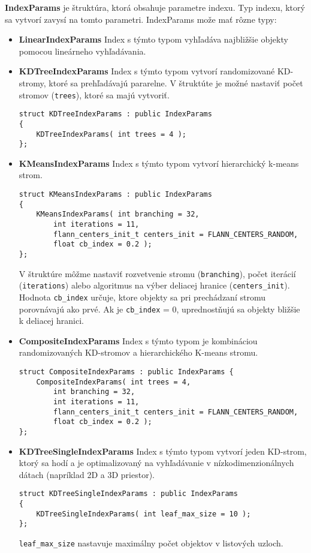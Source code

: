 \documentclass[12pt,oneside]{fithesis2}
\begin{document}
\textbf{IndexParams} je štruktúra, ktorá obsahuje parametre indexu. Typ indexu, ktorý sa vytvorí zavysí na tomto parametri. IndexParams može mať rôzne typy:
\begin{itemize}

\item \textbf{LinearIndexParams} Index s týmto typom vyhľadáva najbližšie objekty pomocou lineárneho vyhľadávania.

\item \textbf{KDTreeIndexParams} Index s týmto typom vytvorí randomizované KD-stromy, ktoré sa prehľadávajú pararelne. V štruktúte je možné nastaviť počet stromov (\texttt{trees}), ktoré sa majú vytvoriť.
{\scriptsize
\begin{lstlisting}
struct KDTreeIndexParams : public IndexParams
{
	KDTreeIndexParams( int trees = 4 );
};
\end{lstlisting}}
\item \textbf{KMeansIndexParams} Index s týmto typom vytvorí hierarchický k-means strom.
{\scriptsize
\begin{lstlisting}
struct KMeansIndexParams : public IndexParams
{
	KMeansIndexParams( int branching = 32,
		int iterations = 11,
		flann_centers_init_t centers_init = FLANN_CENTERS_RANDOM,
		float cb_index = 0.2 );
};
\end{lstlisting}}
V štruktúre môžme nastaviť rozvetvenie stromu (\texttt{branching}), počet iterácií (\texttt{iterations}) alebo algoritmus na výber deliacej hranice (\texttt{centers\_init}). Hodnota \texttt{cb\_index} určuje, ktore objekty sa pri prechádzaní stromu porovnávajú ako prvé. Ak je \texttt{cb\_index} = 0, uprednostňujú sa objekty bližšie k deliacej hranici.

\item \textbf{CompositeIndexParams} Index s týmto typom je kombináciou randomizovaných KD-stromov a hierarchického K-means stromu.
{\scriptsize
\begin{lstlisting}
struct CompositeIndexParams : public IndexParams {
	CompositeIndexParams( int trees = 4,
		int branching = 32,
		int iterations = 11,
		flann_centers_init_t centers_init = FLANN_CENTERS_RANDOM,
		float cb_index = 0.2 );
};
\end{lstlisting}}

\item \textbf{KDTreeSingleIndexParams} Index s týmto typom vytvorí jeden KD-strom, ktorý sa hodí a je optimalizovaný na vyhľadávanie v nízkodimenzionálnych dátach (napríklad 2D a 3D priestor).
{\scriptsize
\begin{lstlisting}
struct KDTreeSingleIndexParams : public IndexParams
{
	KDTreeSingleIndexParams( int leaf_max_size = 10 );
};
\end{lstlisting}}
\texttt{leaf\_max\_size} nastavuje maximálny počet objektov v listových uzloch.


\end{itemize}
\end{document}

